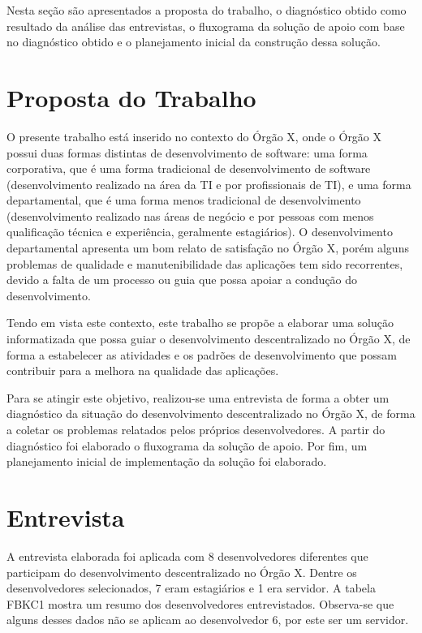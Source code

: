 Nesta seção são apresentados a proposta do trabalho, o diagnóstico obtido como resultado da análise das entrevistas, o fluxograma da solução de apoio com base no diagnóstico obtido e o planejamento inicial da construção dessa solução.

\section{Proposta do Trabalho}

O presente trabalho está inserido no contexto do Órgão X, onde o Órgão X possui duas formas distintas de desenvolvimento de software: uma forma corporativa, que é uma forma tradicional de desenvolvimento de software (desenvolvimento realizado na área da TI e por profissionais de TI), e uma forma departamental, que é uma forma menos tradicional de desenvolvimento (desenvolvimento realizado nas áreas de negócio e por pessoas com menos qualificação técnica e experiência, geralmente estagiários).
O desenvolvimento departamental apresenta um bom relato de satisfação no Órgão X, porém alguns problemas de qualidade e manutenibilidade das aplicações tem sido recorrentes, devido a falta de um processo ou guia que possa apoiar a condução do desenvolvimento.

Tendo em vista este contexto, este trabalho se propõe a elaborar uma solução informatizada que possa guiar o desenvolvimento descentralizado no Órgão X, de forma a estabelecer as atividades e os padrões de desenvolvimento que possam contribuir para a melhora na qualidade das aplicações.

Para se atingir este objetivo, realizou-se uma entrevista de forma a obter um diagnóstico da situação do desenvolvimento descentralizado no Órgão X, de forma a coletar os problemas relatados pelos próprios desenvolvedores. A partir do diagnóstico foi elaborado o fluxograma da solução de apoio. Por fim, um planejamento inicial de implementação da solução foi elaborado.

\section{Entrevista}

A entrevista elaborada foi aplicada com 8 desenvolvedores diferentes que participam do desenvolvimento descentralizado no Órgão X. Dentre os desenvolvedores selecionados, 7 eram estagiários e 1 era servidor. A tabela FBKC1 mostra um resumo dos desenvolvedores entrevistados. Observa-se que alguns desses dados não se aplicam ao desenvolvedor 6, por este ser um servidor.

